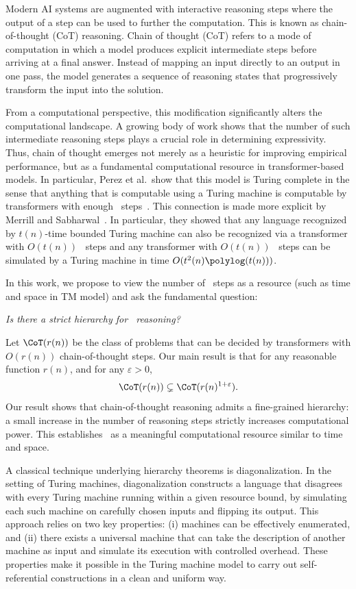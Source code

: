 Modern AI systems are augmented with interactive reasoning steps where the output of a step can be used to further the computation. This is known as chain-of-thought (CoT) reasoning. Chain of thought (CoT) refers to a mode of computation in which a model produces explicit intermediate steps before arriving at a final answer. Instead of mapping an input directly to an output in one pass, the model generates a sequence of reasoning states that progressively transform the input into the solution. 

From a computational perspective, this modification significantly alters the computational landscape. A growing body of work shows that the number of such intermediate reasoning steps plays a crucial role in determining expressivity. Thus, chain of thought emerges not merely as a heuristic for improving empirical performance, but as a fundamental computational resource in transformer-based models. In particular, Perez et al.\ show that this model is Turing complete in the sense that anything that is computable using a Turing machine is computable by transformers with enough \CoT\ steps~\cite{perez2021attention}. This connection is made more explicit by Merrill and Sabharwal~\cite{merrill2023expressive}. In particular, they showed that any language recognized by $t(n)$-time bounded Turing machine can also be recognized via a transformer with $O(t(n))$ \CoT\ steps and any transformer with $O(t(n))$  \CoT\ steps can be simulated by a Turing machine in time $O(t^2(n)\polylog(t(n)))$. 

In this work, we propose to view the number of \CoT\ steps as a resource (such as time and space in TM model) and ask the fundamental question: 
\begin{center}
\em Is there a strict hierarchy for \CoT\ reasoning?
\end{center}
Let $\CoT(r(n))$ be the class of problems that can be decided by transformers with {$O(r(n))$} chain-of-thought steps. 
Our main result is that for any reasonable function $r(n)$, and for any $\varepsilon > 0$,
\[
{\CoT}(r(n)) \subsetneq {\CoT}(r(n)^{1+\varepsilon}).
\]
Our result shows that chain-of-thought reasoning admits a fine-grained hierarchy: a small increase in the number of reasoning steps strictly increases computational power. This establishes \CoT\  as a meaningful computational resource similar to time and space.

A classical technique underlying hierarchy theorems is diagonalization. In the setting of Turing machines, diagonalization constructs a language that disagrees with every Turing machine running within a given resource bound, by simulating each such machine on carefully chosen inputs and flipping its output. This approach relies on two key properties: (i) machines can be effectively enumerated, and (ii) there exists a universal machine that can take the description of another machine as input and simulate its execution with controlled overhead. These properties make it possible in the Turing machine model to carry out self-referential constructions in a clean and uniform way. 


